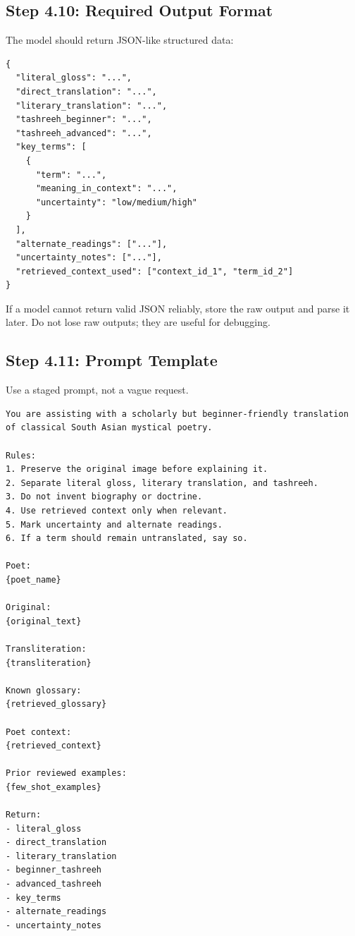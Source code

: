 \documentclass[11pt]{article}
\begin{document}
\subsection{Step 4.10: Required Output Format}

The model should return JSON-like structured data:

\begin{verbatim}
{
  "literal_gloss": "...",
  "direct_translation": "...",
  "literary_translation": "...",
  "tashreeh_beginner": "...",
  "tashreeh_advanced": "...",
  "key_terms": [
    {
      "term": "...",
      "meaning_in_context": "...",
      "uncertainty": "low/medium/high"
    }
  ],
  "alternate_readings": ["..."],
  "uncertainty_notes": ["..."],
  "retrieved_context_used": ["context_id_1", "term_id_2"]
}
\end{verbatim}

If a model cannot return valid JSON reliably, store the raw output and parse it
later. Do not lose raw outputs; they are useful for debugging.

\subsection{Step 4.11: Prompt Template}

Use a staged prompt, not a vague request.

\begin{verbatim}
You are assisting with a scholarly but beginner-friendly translation
of classical South Asian mystical poetry.

Rules:
1. Preserve the original image before explaining it.
2. Separate literal gloss, literary translation, and tashreeh.
3. Do not invent biography or doctrine.
4. Use retrieved context only when relevant.
5. Mark uncertainty and alternate readings.
6. If a term should remain untranslated, say so.

Poet:
{poet_name}

Original:
{original_text}

Transliteration:
{transliteration}

Known glossary:
{retrieved_glossary}

Poet context:
{retrieved_context}

Prior reviewed examples:
{few_shot_examples}

Return:
- literal_gloss
- direct_translation
- literary_translation
- beginner_tashreeh
- advanced_tashreeh
- key_terms
- alternate_readings
- uncertainty_notes
\end{verbatim}
\end{document}
